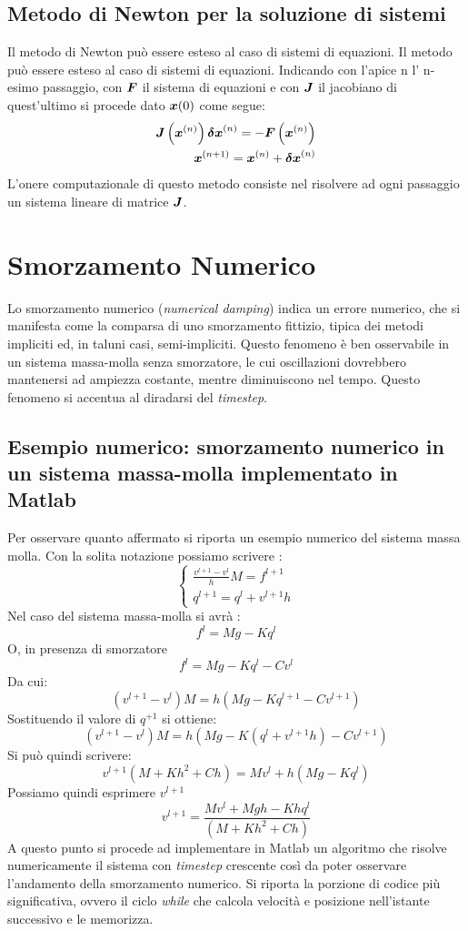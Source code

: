 \subsection{Metodo di Newton per la soluzione di sistemi}
Il metodo di Newton può essere esteso al caso di sistemi di equazioni. 
Il metodo può essere esteso al caso di sistemi di equazioni. Indicando con l'apice n l' n-esimo passaggio, con ${\boldsymbol{F}}$ il sistema di equazioni e con ${\boldsymbol{J}}$ il jacobiano di quest'ultimo si procede dato ${\boldsymbol{x}}{(0)}$ come segue:
\begin{align} \label{eq:NewtonRaphsonA}
    {\boldsymbol{J}}\left( {\boldsymbol{x}}^{(n)} \right) {\boldsymbol{\delta x}}^{(n)} = - {\boldsymbol{F}}\left( {\boldsymbol{x}}^{(n)} \right) \\
    \label{eq:NewtonRaphsonB}  {\boldsymbol{x}}^{(n+1)} = {\boldsymbol{x}}^{(n)} + {\boldsymbol{\delta x}}^{(n)} 
\end{align}
L'onere computazionale di questo metodo consiste nel risolvere ad ogni passaggio un sistema lineare di matrice ${\boldsymbol{J}}$.

\section{Smorzamento Numerico} \label{sec_numdamp}
Lo smorzamento numerico (\textit{numerical damping}) indica un errore numerico, che si manifesta come la comparsa di uno smorzamento fittizio, tipica dei metodi impliciti ed, in taluni casi, semi-impliciti. Questo fenomeno è ben osservabile in un sistema massa-molla senza smorzatore, le cui oscillazioni dovrebbero mantenersi ad ampiezza costante, mentre diminuiscono nel tempo. Questo fenomeno si accentua al diradarsi del \textit{timestep}.
\subsection{Esempio numerico: smorzamento numerico in un sistema massa-molla implementato in Matlab}
Per osservare quanto affermato si riporta un esempio numerico del sistema massa molla. Con la solita notazione possiamo scrivere :\[\begin{cases}\frac{v^{l+1}-v^l}{h}M = f^{l+1}\\ q^{l+1}= q^l+v^{l+1}h \end{cases}\]
Nel caso del sistema massa-molla si avrà : \[f^l = Mg-Kq^l \]O, in presenza di smorzatore \[ f^l = Mg-Kq^l-Cv^l\]
Da cui:  \[ \left(v^{l+1}-v^l\right)M = h\left(  Mg-Kq^{l+1} -Cv^{l+1} \right)  \]
Sostituendo il valore di $q^{+1}$ si ottiene:
\[ \left(v^{l+1}-v^l\right)M = h\left(  Mg-K(q^l+v^{l+1}h) -Cv^{l+1} \right)  \]
Si può quindi scrivere:
\[ v^{l+1}\left(M+Kh^2+Ch\right) = Mv^l + h\left(  Mg-Kq^l \right)  \]
Possiamo quindi esprimere $v^{l+1}$
\[ v^{l+1} = \frac{ Mv^l + Mgh -Khq^l }{\left(M+Kh^2+Ch\right)}  \]
A questo punto si procede ad implementare in Matlab un algoritmo che risolve numericamente il sistema con \textit{timestep} crescente così da poter osservare l'andamento della smorzamento numerico. Si riporta la porzione di codice più significativa, ovvero il ciclo \textit{while} che calcola velocità e posizione nell'istante successivo e le memorizza.


